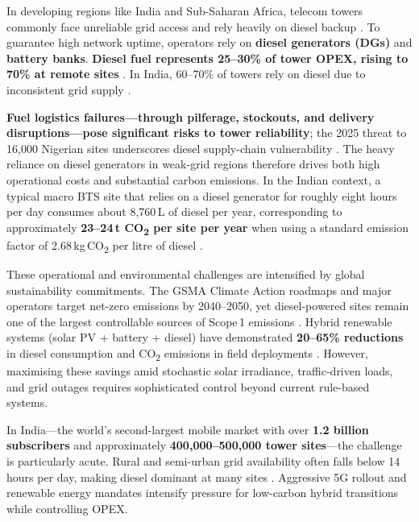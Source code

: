 In developing regions like India and Sub-Saharan Africa, telecom towers
commonly face unreliable grid access and rely heavily on diesel backup
\citep{gsma2020_tower_esco}. To guarantee high network uptime, operators
rely on \textbf{diesel generators (DGs)} and \textbf{battery banks}.
\textbf{Diesel fuel represents 25--30\% of tower OPEX, rising to 70\% at
remote sites} \citep{datoms2024,gsma2020_tower_esco}.
In India, 60--70\% of towers rely on diesel due to inconsistent grid supply
\citep{datoms2024}.

\textbf{Fuel logistics failures---through pilferage, stockouts, and delivery
disruptions---pose significant risks to tower reliability}; the 2025 threat
to 16{,}000 Nigerian sites underscores diesel supply-chain vulnerability
\citep{datoms2024,alton2025}. The heavy reliance on diesel generators in
weak-grid regions therefore drives both high operational costs and substantial
carbon emissions. In the Indian context, a typical macro BTS site that relies
on a diesel generator for roughly eight hours per day consumes about
8{,}760\,L of diesel per year, corresponding to approximately
\textbf{23--24\,t CO\textsubscript{2} per site per year} when using a standard
emission factor of 2.68\,kg\,CO\textsubscript{2} per litre of diesel
\citep{trai2011_green_telecom,ghgprotocol2017_emission_factors}.

These operational and environmental challenges are intensified by global
sustainability commitments. The GSMA Climate Action roadmaps and major
operators target net-zero emissions by 2040--2050, yet diesel-powered sites
remain one of the largest controllable sources of Scope\,1 emissions
\citep{gsma2023}. Hybrid renewable systems (solar PV + battery + diesel) have
demonstrated \textbf{20--65\% reductions} in diesel consumption and CO\textsubscript{2}
emissions in field deployments \citep{gsma2020_tower_esco,datoms2024}.
However, maximising these savings amid stochastic solar irradiance,
traffic-driven loads, and grid outages requires sophisticated control beyond
current rule-based systems.

In India---the world's second-largest mobile market with over
\textbf{1.2 billion subscribers} and approximately
\textbf{400{,}000--500{,}000 tower sites}---the challenge is particularly
acute. Rural and semi-urban grid availability often falls below 14 hours per
day, making diesel dominant at many sites \citep{trai2024,datoms2024}.
Aggressive 5G rollout and renewable energy mandates intensify pressure for
low-carbon hybrid transitions while controlling OPEX.


